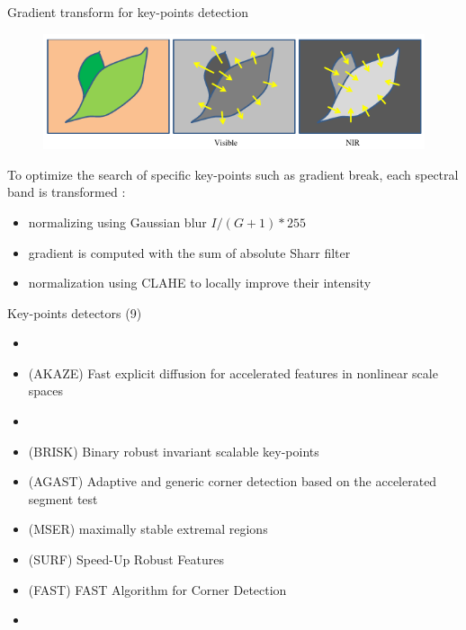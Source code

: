 \documentclass{beamer}
\begin{document}
		\begin{frame}{Gradient transform for key-points detection}
			\begin{figure}
				\includegraphics[width=0.7\linewidth]{../figures/contrast-inversion.png}
			\end{figure}
		
			To optimize the search of specific key-points such as gradient break,
			each spectral band is transformed :
			\begin{itemize}
				\item normalizing using Gaussian blur $I/(G+1)*255$ 
				\item gradient is computed with the sum of absolute Sharr filter
				\item normalization using CLAHE to locally improve their intensity
			\end{itemize}
		\end{frame}
	
		\begin{frame}{Key-points detectors (9)}
			\begin{itemize}
				\item {\color{orange}{(ORB) Oriented FAST and Rotated BRIEF}}
				\item (AKAZE) Fast explicit diffusion for accelerated features in nonlinear scale spaces
				\item {\color{orange}{(KAZE) A novel multi-scale 2D feature detection and description algorithm in nonlinear scale spaces}}
				\item (BRISK) Binary robust invariant scalable key-points
				\item (AGAST) Adaptive and generic corner detection based on the accelerated segment test
				\item (MSER) maximally stable extremal regions
				\item (SURF) Speed-Up Robust Features
				\item (FAST) FAST Algorithm for Corner Detection
				\item {\color{purple}{(GFTT) Good Features To Track}}
			\end{itemize}
		\end{frame}
	
\end{document}
